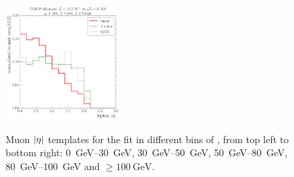\begin{figure}[!htbp]
    \hspace*{\fill} \\
    \hspace*{\fill}
    {\includegraphics[width=0.39\textwidth]{measurement/MT/central/fit_templates/muon_templates_bin_100-inf}}
    \hspace*{\fill}
    \caption{Muon $\lvert \eta \rvert$ templates for the fit in different bins of \MT,
    from top left to bottom right: \SIrange{0}{30}{\GeV}, \SIrange{30}{50}{\GeV},
    \SIrange{50}{80}{\GeV}, \SIrange{80}{100}{\GeV} and $\geq \SI{100}{\GeV}$.}
    \label{fig:fit_templates_MT_muon}
\end{figure}



